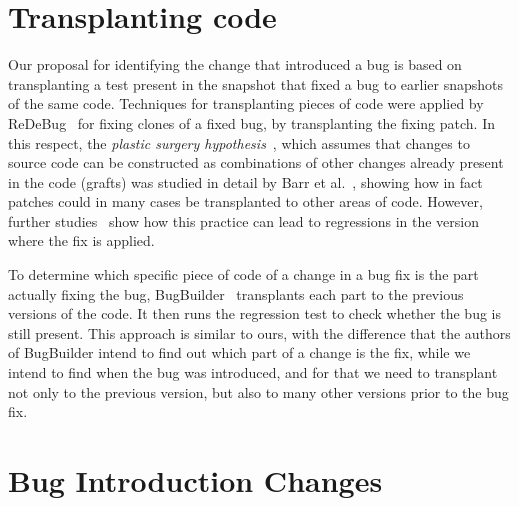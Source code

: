 \section{Transplanting code}
\label{sec:transplating-code:related}

Our proposal for identifying the change that introduced a bug is based on transplanting a test present in the snapshot that fixed a bug to earlier snapshots of the same code. Techniques for transplanting pieces of code were applied by ReDeBug~\cite{jang2012redebug} for fixing clones of a fixed bug, by transplanting the fixing patch. In this respect, the \emph{plastic surgery hypothesis}~\cite{harman2010:automated_patching}, which assumes that changes to source code can be constructed as combinations of other changes already present in the code (grafts) was studied in detail by Barr et al.~\cite{barr2014plastic}, showing how in fact patches could in many cases be transplanted to other areas of code. However, further studies~\cite{castelluccio2019empirical} show how this practice can lead to regressions in the version where the fix is applied.

To determine which specific piece of code of a change in a bug fix is the part actually fixing the bug, BugBuilder~\cite{jiang2021extracting} transplants each part to the previous versions of the code. It then runs the regression test to check whether the bug is still present. This approach is similar to ours, with the difference that the authors of BugBuilder intend to find out which part of a change is the fix, while we intend to find when the bug was introduced, and for that we need to transplant not only to the previous version, but also to many other versions prior to the bug fix.

\newpage

\section{Bug Introduction Changes}
\label{sec:bic:related}

